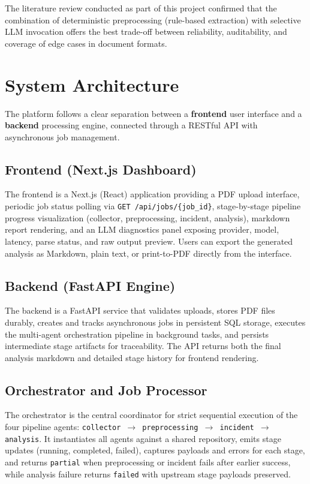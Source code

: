 \documentclass[11pt,a4paper]{article}
\begin{document}
The literature review conducted as part of this project confirmed that the combination of deterministic preprocessing (rule-based extraction) with selective LLM invocation offers the best trade-off between reliability, auditability, and coverage of edge cases in document formats.

\section{System Architecture}

The platform follows a clear separation between a \textbf{frontend} user interface and a \textbf{backend} processing engine, connected through a RESTful API with asynchronous job management.

\subsection{Frontend (Next.js Dashboard)}

The frontend is a Next.js (React) application providing a PDF upload interface, periodic job status polling via \texttt{GET /api/jobs/\{job\_id\}}, stage-by-stage pipeline progress visualization (collector, preprocessing, incident, analysis), markdown report rendering, and an LLM diagnostics panel exposing provider, model, latency, parse status, and raw output preview. Users can export the generated analysis as Markdown, plain text, or print-to-PDF directly from the interface.

\subsection{Backend (FastAPI Engine)}

The backend is a FastAPI service that validates uploads, stores PDF files durably, creates and tracks asynchronous jobs in persistent SQL storage, executes the multi-agent orchestration pipeline in background tasks, and persists intermediate stage artifacts for traceability. The API returns both the final analysis markdown and detailed stage history for frontend rendering.

\subsection{Orchestrator and Job Processor}

The orchestrator is the central coordinator for strict sequential execution of the four pipeline agents: \texttt{collector $\rightarrow$ preprocessing $\rightarrow$ incident $\rightarrow$ analysis}. It instantiates all agents against a shared repository, emits stage updates (running, completed, failed), captures payloads and errors for each stage, and returns \texttt{partial} when preprocessing or incident fails after earlier success, while analysis failure returns \texttt{failed} with upstream stage payloads preserved.
\end{document}
